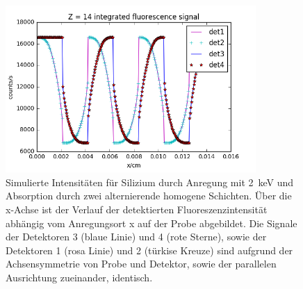 \begin{figure}[H] 
  \centering
     \includegraphics[width=0.85\textwidth]{illustrations/si_fe_si_signal.png}
  \caption[Simuliertes Siliziumsignal über Siliziumkante]{Simulierte Intensitäten für Silizium durch Anregung mit \SI{2}{\kilo\electronvolt} und Absorption durch zwei alternierende homogene Schichten. Über die x-Achse ist der Verlauf der detektierten Fluoreszenzintensität abhängig vom Anregungsort x auf der Probe abgebildet. Die Signale der Detektoren 3 (blaue Linie) und 4 (rote Sterne), sowie der Detektoren 1 (rosa Linie) und 2 (türkise Kreuze) sind aufgrund der Achsensymmetrie von Probe und Detektor, sowie der parallelen Ausrichtung zueinander, identisch.}
  \label{fig:si_fe_si_signal}
\end{figure}

